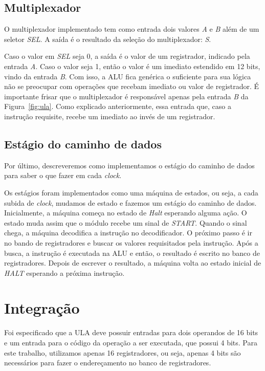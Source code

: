 \documentclass[11pt,a4paper,titlepage]{article}
\begin{document}
\subsection{Multiplexador}\label{subsec:mux}

O multiplexador implementado tem como entrada dois valores \textit{A} e \textit{B} além de um seletor \textit{SEL}.
A saída é o resultado da seleção do multiplexador: \textit{S}.

Caso o valor em \textit{SEL} seja 0, a saída é o valor de um registrador, indicado pela entrada \textit{A}.
Caso o valor seja 1, então o valor é um imediato estendido em 12 bits, vindo da entrada \textit{B}.
Com isso, a ALU fica genérica o suficiente para sua lógica não se preocupar com operações que recebam imediato ou valor de registrador.
É importante frisar que o multiplexador é responsável apenas pela entrada \textit{B} da Figura~\ref{fig:ula}.
Como explicado anteriormente, essa entrada que, caso a instrução requisite, recebe um imediato ao invés de um registrador.

\subsection{Estágio do caminho de dados}\label{subsec:exec}

Por último, descreveremos como implementamos o estágio do caminho de dados para saber o que fazer em cada \textit{clock}.

Os estágios foram implementados como uma máquina de estados, ou seja, a cada subida de \textit{clock}, mudamos de estado e fazemos um estágio do caminho de dados.
Inicialmente, a máquina começa no estado de \textit{Halt} esperando alguma ação.
O estado muda assim que o módulo recebe um sinal de \textit{START}.
Quando o sinal chega, a máquina decodifica a instrução no decodificador.
O próximo passo é ir no bando de registradores e buscar os valores requisitados pela instrução.
Após a busca, a instrução é executada na ALU e então, o resultado é escrito no banco de registradores.
Depois de escrever o resultado, a máquina volta ao estado inicial de \textit{HALT} esperando a próxima instrução.

\section{Integração}

Foi especificado que a ULA deve possuir entradas para dois operandos de 16 bits e um entrada para o código da operação a ser executada, que possui 4 bits.
Para este trabalho, utilizamos apenas 16 registradores, ou seja, apenas 4 bits são necessários para fazer o endereçamento no banco de registradores.
\end{document}
